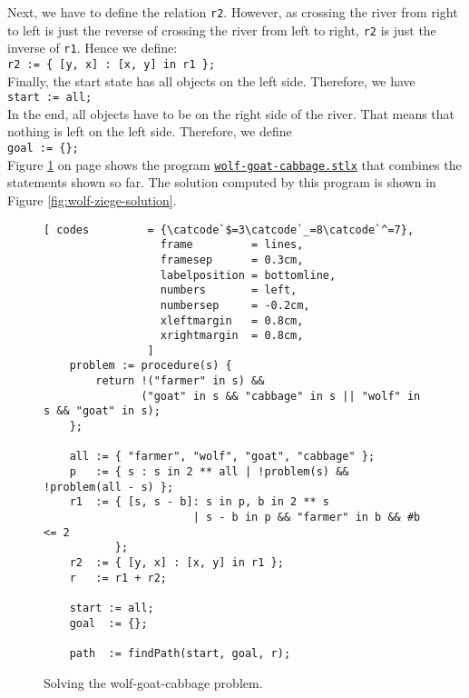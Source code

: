 Next, we have to define the relation \texttt{r2}.  However, as crossing the river from right to left
is just the reverse of crossing the river from left to right, \texttt{r2} is just the inverse of
\texttt{r1}.   Hence we define:
\\[0.2cm]
\hspace*{1.3cm}
\texttt{r2  := \{ [y, x] : [x, y] in r1 \};}
\\[0.2cm]
Finally, the start state has all objects on the left side.  Therefore, we have
\\[0.2cm]
\hspace*{1.3cm}
\texttt{start := all;}
\\[0.2cm]
In the end, all objects have to be on the right side of the river.  That means that nothing is left
on the left side.  Therefore, we define
\\[0.2cm]
\hspace*{1.3cm}
\texttt{goal := \{\};}
\\[0.2cm]
Figure \ref{fig:wolf-ziege} on page \pageref{fig:wolf-ziege} shows the program
\href{https://github.com/karlstroetmann/Logik/blob/master/SetlX/wolf-goat-cabbage.stlx}{\texttt{wolf-goat-cabbage.stlx}}
that combines the statements shown so far.  The solution computed by this program is shown in Figure
 \ref{fig:wolf-ziege-solution}.

\begin{figure}[!ht]
  \centering
\begin{Verbatim}[ codes         = {\catcode`$=3\catcode`_=8\catcode`^=7},
                  frame         = lines, 
                  framesep      = 0.3cm, 
                  labelposition = bottomline,
                  numbers       = left,
                  numbersep     = -0.2cm,
                  xleftmargin   = 0.8cm,
                  xrightmargin  = 0.8cm,
                ]
    problem := procedure(s) {
        return !("farmer" in s) &&
               ("goat" in s && "cabbage" in s || "wolf" in s && "goat" in s);
    };
   
    all := { "farmer", "wolf", "goat", "cabbage" };
    p   := { s : s in 2 ** all | !problem(s) && !problem(all - s) };
    r1  := { [s, s - b]: s in p, b in 2 ** s
                       | s - b in p && "farmer" in b && #b <= 2
           };
    r2  := { [y, x] : [x, y] in r1 };
    r   := r1 + r2;
    
    start := all;
    goal  := {};
    
    path  := findPath(start, goal, r);
\end{Verbatim} 
\vspace*{-0.3cm}
\caption{Solving the wolf-goat-cabbage problem.}  
\label{fig:wolf-ziege}
\end{figure}


